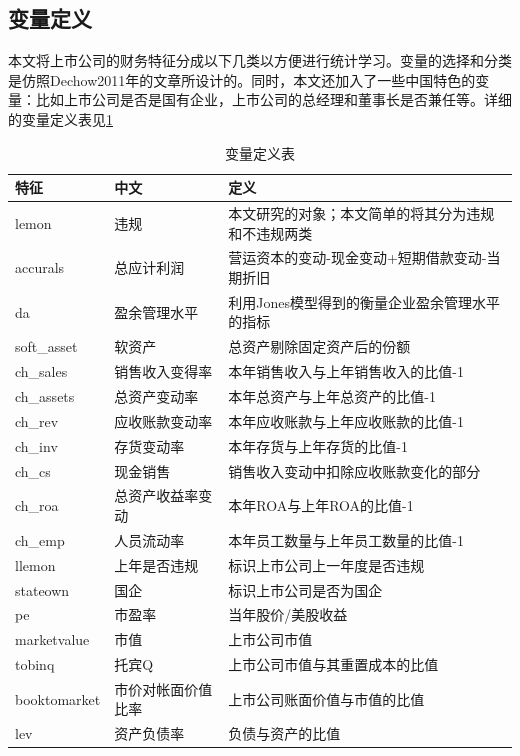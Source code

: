 \documentclass{article}
\begin{document}
\subsection{变量定义}
\par 本文将上市公司的财务特征分成以下几类以方便进行统计学习。变量的选择和分类是仿照Dechow\cite{Dechow2011Predicting}2011年的文章所设计的。同时，本文还加入了一些中国特色的变量：比如上市公司是否是国有企业，上市公司的总经理和董事长是否兼任等。详细的变量定义表见\ref{tab:vardefination}
\begin{table}[htbp]
  \centering \kaishu \small
  \caption{变量定义表}
    \begin{tabular}{p{6.265em}ll} \hline\hline
    特征    & 中文    & 定义 \\ \hline
    lemon & 违规    & 本文研究的对象；本文简单的将其分为违规和不违规两类 \\
    accurals & 总应计利润 & 营运资本的变动-现金变动+短期借款变动-当期折旧 \\
    da    & 盈余管理水平 & 利用Jones模型得到的衡量企业盈余管理水平的指标 \\
    soft\_asset & 软资产   & 总资产剔除固定资产后的份额 \\
    ch\_sales & 销售收入变得率 & 本年销售收入与上年销售收入的比值-1 \\
    ch\_assets & 总资产变动率 & 本年总资产与上年总资产的比值-1\\
    ch\_rev & 应收账款变动率 & 本年应收账款与上年应收账款的比值-1\\
    ch\_inv & 存货变动率 & 本年存货与上年存货的比值-1 \\
    ch\_cs & 现金销售  & 销售收入变动中扣除应收账款变化的部分 \\
    ch\_roa & 总资产收益率变动 & 本年ROA与上年ROA的比值-1 \\
    ch\_emp & 人员流动率 & 本年员工数量与上年员工数量的比值-1 \\
    llemon & 上年是否违规 & 标识上市公司上一年度是否违规 \\
    stateown & 国企    & 标识上市公司是否为国企 \\
    pe    & 市盈率   & 当年股价/美股收益 \\
    marketvalue & 市值    & 上市公司市值 \\
    tobinq & 托宾Q   & 上市公司市值与其重置成本的比值 \\
    booktomarket & 市价对帐面价值比率 & 上市公司账面价值与市值的比值 \\
    lev   & 资产负债率 & 负债与资产的比值 \\ \hline\hline
    \end{tabular}%
  \label{tab:vardefination}%
\end{table}%
\end{document}

